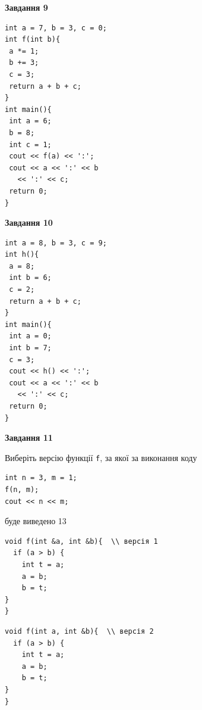 \documentclass[12pt, ukrainian]{article}
\def\code#1{\Verb!#1!}
\begin{document}
{\begin {large}
\begin{minipage}[t]{11.0cm}
\end{minipage}


\begin{minipage}[t]{7.0cm}

\begin{center}
\textbf{Завдання 9}
\end{center}
\vspace{-8mm}

\begin{verbatim}
int a = 7, b = 3, c = 0;
int f(int b){
 a *= 1;
 b += 3;
 c = 3;
 return a + b + c;
}
int main(){
 int a = 6;
 b = 8;
 int c = 1;
 cout << f(a) << ':';
 cout << a << ':' << b 
   << ':' << c;
 return 0;
}
\end{verbatim}



\begin{center}
\textbf{Завдання 10}
\end{center}
\vspace{-8mm}

\begin{verbatim}
int a = 8, b = 3, c = 9;
int h(){
 a = 8;
 int b = 6;
 c = 2;
 return a + b + c;
}
int main(){
 int a = 0;
 int b = 7;
 c = 3;
 cout << h() << ':';
 cout << a << ':' << b 
   << ':' << c;
 return 0;
}
\end{verbatim}

\end{minipage}
\vline \hspace{1mm}
\begin{minipage}[t]{11.0cm}

\begin{center}
\textbf{Завдання 11}
\end{center}
Виберіть версію функції \code{f}, за якої за виконання коду
\begin{verbatim}
int n = 3, m = 1;
f(n, m);
cout << n << m;
\end{verbatim}

буде виведено 13

\begin{verbatim}
void f(int &a, int &b){  \\ версія 1
  if (a > b) {
    int t = a;
    a = b;
    b = t;
}  
}
\end{verbatim}

\vspace{-8mm}\begin{verbatim}
void f(int a, int &b){  \\ версія 2
  if (a > b) {
    int t = a;
    a = b;
    b = t;
}  
}
\end{verbatim}


\end{minipage}
\end{large}}
\end{document}

